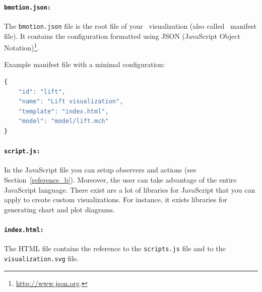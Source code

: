 \paragraph{\texttt{bmotion.json:}}
The \texttt{bmotion.json} file is the root file of your \bms\ visualization (also called \bms\ manifest file).
It contains the configuration formatted using JSON (JavaScript Object Notation)\footnote{\url{http://www.json.org}.}.



Example manifest file with a minimal configuration:

\begin{lstlisting}[language=JavaScript]
{
    "id": "lift",
    "name": "Lift visualization",
    "template": "index.html",
    "model": "model/lift.mch"
}
\end{lstlisting}


\paragraph{\texttt{script.js:}}
In the JavaScript file you can setup observers and actions (see Section~\ref{reference_b}).
Moreover, the user can take advantage of the entire JavaScript language.
There exist are a lot of libraries for JavaScript that you can apply to create custom visualizations.
For instance, it exists libraries for generating chart and plot diagrams.


\paragraph{\texttt{index.html:}}
The HTML file contains the reference to the \texttt{scripts.js} file and to the \texttt{visualization.svg} file.


